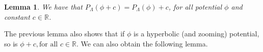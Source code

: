 \documentclass[12pt,a4paper]{amsart}
\theoremstyle{plain}
\newtheorem{lemma}{Lemma}[subsection]
\begin{document}
\begin{lemma} 
	We have that $P_{\Lambda}(\phi + c) = P_{\Lambda}(\phi) + c$, for all potential $\phi$ and constant $c \in \mathbb{R}$. 
\end{lemma}

%	

The previous lemma also shows that if $\phi$ is a hyperbolic (and zooming) potential, so is $\phi + c, \text{for all} \, \, c \in \mathbb{R}$. We can also obtain the following lemma.
\end{document}
